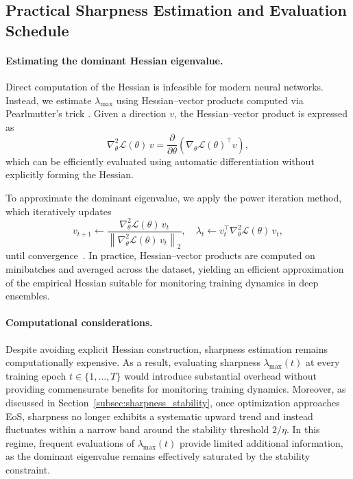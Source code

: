 \documentclass[sigconf]{acmart}
\begin{document}
\subsection{Practical Sharpness Estimation and Evaluation Schedule}
\label{subsec:sharpness_schedule}

\paragraph{Estimating the dominant Hessian eigenvalue.}
Direct computation of the Hessian is infeasible for modern neural networks.
Instead, we estimate $\lambda_{\max}$ using Hessian--vector products computed via Pearlmutter's trick \citep{pearlmutter1994fast}.
Given a direction $v$, the Hessian--vector product is expressed as
\[
\nabla^2_{\theta} \mathcal{L}(\theta)\, v
=
\frac{\partial}{\partial \theta}
\left(
\nabla_{\theta} \mathcal{L}(\theta)^\top v
\right),
\]
which can be efficiently evaluated using automatic differentiation without explicitly forming the Hessian.

To approximate the dominant eigenvalue, we apply the power iteration method, which iteratively updates
\[
v_{t+1} \leftarrow
\frac{\nabla^2_{\theta} \mathcal{L}(\theta)\, v_t}
{\left\| \nabla^2_{\theta} \mathcal{L}(\theta)\, v_t \right\|_2},
\quad
\lambda_t \leftarrow
v_t^\top \nabla^2_{\theta} \mathcal{L}(\theta)\, v_t,
\]
until convergence~\citep{golub2013matrix}.
In practice, Hessian--vector products are computed on minibatches and averaged across the dataset, yielding an efficient approximation of the empirical Hessian suitable for monitoring training dynamics in deep ensembles.

\paragraph{Computational considerations.}
Despite avoiding explicit Hessian construction,
sharpness estimation remains computationally expensive.
As a result, evaluating sharpness $\lambda_{\max}(t)$ at every training epoch $t \in \{1,\dots,T\}$ would introduce substantial overhead without providing commensurate benefits for monitoring training dynamics.
Moreover, as discussed in Section~\ref{subsec:sharpness_stability}, once optimization approaches EoS, sharpness no longer exhibits a systematic upward trend and instead fluctuates within a narrow band around the stability threshold \( 2/\eta \).
In this regime, frequent evaluations of $\lambda_{\max}(t)$ provide limited additional information, as the dominant eigenvalue remains effectively saturated by the stability constraint.
\end{document}
